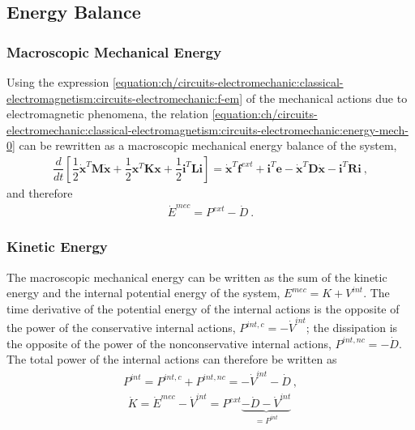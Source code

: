 \documentclass[letterpaper,10pt,english]{jupyterBook}
\begin{document}
\subsection{Energy Balance}
\label{\detokenize{ch/circuits-electromechanic:energy-balance}}

\subsubsection{Macroscopic Mechanical Energy}
\label{\detokenize{ch/circuits-electromechanic:macroscopic-mechanical-energy}}
\sphinxAtStartPar
Using the expression \eqref{equation:ch/circuits-electromechanic:classical-electromagnetism:circuits-electromechanic:f-em} of the mechanical actions due to electromagnetic phenomena, the relation \eqref{equation:ch/circuits-electromechanic:classical-electromagnetism:circuits-electromechanic:energy-mech-0} can be rewritten as a macroscopic mechanical energy balance of the system,
\begin{equation*}
\begin{split}\dfrac{d}{dt} \left[ \dfrac{1}{2} \dot{\mathbf{x}}^T \mathbf{M} \dot{\mathbf{x}} + \dfrac{1}{2} \mathbf{x}^T \mathbf{K} \mathbf{x} + \dfrac{1}{2} \mathbf{i}^T \mathbf{L} \mathbf{i} \right] = \dot{\mathbf{x}}^T \mathbf{f}^{ext} + \mathbf{i}^T \mathbf{e} - \dot{\mathbf{x}}^T \mathbf{D} \dot{\mathbf{x}} - \mathbf{i}^T \mathbf{R} \mathbf{i} \ , \end{split}
\end{equation*}
\sphinxAtStartPar
and therefore
\begin{equation*}
\begin{split}\dot{E}^{mec} = P^{ext} - \dot{D} \ .\end{split}
\end{equation*}

\subsubsection{Kinetic Energy}
\label{\detokenize{ch/circuits-electromechanic:kinetic-energy}}
\sphinxAtStartPar
The macroscopic mechanical energy can be written as the sum of the kinetic energy and the internal potential energy of the system, \(E^{mec} = K + V^{int}\). The time derivative of the potential energy of the internal actions is the opposite of the power of the conservative internal actions, \(P^{int, c} = - \dot{V}^{int}\); the dissipation is the opposite of the power of the non\sphinxhyphen{}conservative internal actions, \(P^{int, nc} = - \dot{D}\). The total power of the internal actions can therefore be written as
\begin{equation*}
\begin{split}P^{int} = P^{int, c} + P^{int, nc} = - \dot{V}^{int} - \dot{D} \ ,\end{split}
\end{equation*}\begin{equation*}
\begin{split}\dot{K} = \dot{E}^{mec} - \dot{V}^{int} = P^{ext} \underbrace{- \dot{D} - \dot{V}^{int}}_{=P^{int}} \  \end{split}
\end{equation*}
\end{document}
